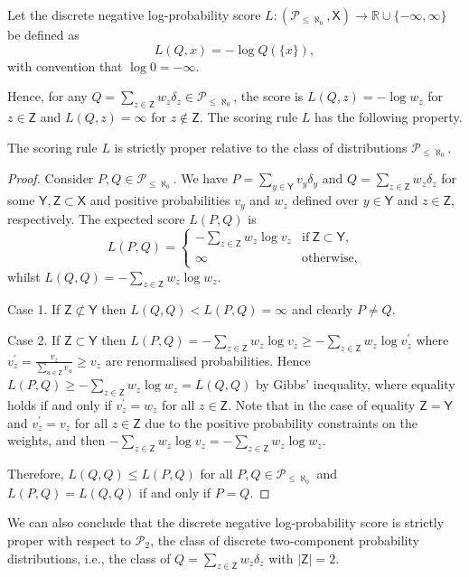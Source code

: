 \documentclass{article}
\theoremstyle{plain}
\theoremstyle{plain}
\theoremstyle{definition}
\theoremstyle{remark}
\theoremstyle{plain}
\begin{document}
\begin{definition}\label{def:logprobdiscrete}
Let the discrete negative log-probability score $L:(\mathcal{P}_{\le \aleph_0},\mathsf{X}) \rightarrow \mathbb{R} \cup \{-\infty,\infty\}$ be defined as
\begin{equation*}
    L(Q,x) = 
    -\log Q(\{x\}),
\end{equation*}
with convention that $\log 0 = -\infty$.
\end{definition}
Hence, for any $Q = \sum_{z \in \mathsf{Z}} w_z \delta_{z}\in \mathcal{P}_{\le \aleph_0}$, the score is $L(Q,z) = -\log w_z$ for $z \in \mathsf{Z}$ and $L(Q,z) = \infty$ for $z \notin \mathsf{Z}$. The scoring rule $L$ has the following property.
\begin{proposition}
    The scoring rule $L$ is strictly proper relative to the class of distributions $\mathcal{P}_{\le \aleph_0}$. 
\end{proposition}
\begin{proof}
    Consider $P,Q \in \mathcal{P}_{\le \aleph_0}$. We have $P = \sum_{y \in \mathsf{Y}} v_y \delta_{y}$ and $Q = \sum_{z \in \mathsf{Z}} w_z \delta_{z}$ for some $\mathsf{Y}, \mathsf{Z}\subset \mathsf{X}$ and positive probabilities $v_y$ and $w_z$ defined over $y \in \mathsf{Y}$ and $z \in \mathsf{Z}$, respectively. The expected score $L(P,Q)$ is
\begin{equation*}
    L(P,Q) = 
    \begin{cases}
        -\sum_{z\in \mathsf{Z}}w_{z} \log v_z & \text{if}~\mathsf{Z} \subset \mathsf{Y}, \\
        \infty & \text{otherwise,}
    \end{cases}      
\end{equation*}
whilst $L(Q,Q) = -\sum_{z\in \mathsf{Z}}w_{z} \log w_z$.

Case 1. If $\mathsf{Z} \not\subset \mathsf{Y}$ then $L(Q,Q)<L(P,Q)=\infty$ and clearly $P \neq Q$.

Case 2. If $\mathsf{Z} \subset \mathsf{Y}$ then 
$L(P,Q) = -\sum_{z\in \mathsf{Z}}w_{z} \log v_z \geq -\sum_{z\in \mathsf{Z}}w_{z} \log v_z^\prime$ where $v_z^\prime = \frac{v_z}{\sum_{u\in \mathsf{Z}} v_u} \geq v_z$ are renormalised probabilities. Hence 
$L(P,Q) \geq -\sum_{z\in \mathsf{Z}}w_{z} \log w_z = L(Q,Q)$ by Gibbs' inequality, where equality holds if and only if $v_z^\prime = w_z$ for all $z \in \mathsf{Z}$. Note that in the case of equality $\mathsf{Z}=\mathsf{Y}$ and $v_z^\prime = v_z$ for all $z \in \mathsf{Z}$ due to the positive probability constraints on the weights, and then $-\sum_{z\in \mathsf{Z}}w_{z} \log v_z = -\sum_{z\in \mathsf{Z}}w_{z} \log w_z$.

Therefore, $L(Q,Q) \leq L(P,Q)$ for all $P,Q\in \mathcal{P}_{\le \aleph_0}$ and $L(P,Q) = L(Q,Q)$ if and only if $P=Q$.

\end{proof}
We can also conclude that the discrete negative log-probability score is strictly proper with respect to $\mathcal{P}_2$, the class of discrete two-component probability distributions, i.e., the class of $Q = \sum_{z \in \mathsf Z} w_z \delta_z$ with $\vert\mathsf{Z}\vert = 2$.
\end{document}
